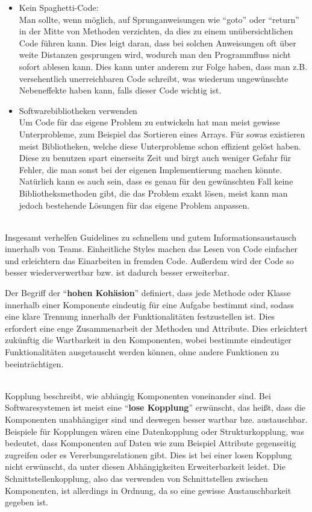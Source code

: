 \begin{itemize}
\item Kein Spaghetti-Code:\\
	Man sollte, wenn möglich, auf Sprunganweisungen wie ``goto'' oder ``return'' in der Mitte von Methoden verzichten, da dies zu einem unübersichtlichen Code führen kann.
    Dies leigt daran, dass bei solchen Anweisungen oft über weite Distanzen gesprungen wird, wodurch man den Programmfluss nicht sofort ablesen kann. Dies kann unter anderem
    zur Folge haben, dass man z.B. versehentlich unerreichbaren Code schreibt, was wiederum ungewünschte Nebeneffekte haben kann, falls dieser Code wichtig ist.
\item Softwarebibliotheken verwenden\\
    Um Code für das eigene Problem zu entwickeln hat man meist gewisse Unterprobleme, zum Beispiel das Sortieren eines Arrays. Für sowas existieren meist Bibliotheken, welche
    diese Unterprobleme schon effizient gelöst haben. Diese zu benutzen spart einerseits Zeit und birgt auch weniger Gefahr für Fehler, die man sonst bei der eigenen Implementierung
    machen könnte. Natürlich kann es auch sein, dass es genau für den gewünschten Fall keine Bibliotheksmethoden gibt, die das Problem exakt lösen, meist kann man jedoch bestehende
    Lösungen für das eigene Problem anpassen.
\end{itemize}\ \\
Insgesamt verhelfen Guidelines zu schnellem und gutem Informationsaustausch innerhalb von Teams. Einheitliche Styles machen das Lesen von Code einfacher und erleichtern das Einarbeiten
in fremden Code. Außerdem wird der Code so besser wiederverwertbar bzw. ist dadurch besser erweiterbar.

Der Begriff der ``\textbf{hohen Kohäsion}'' definiert, dass jede Methode oder Klasse innerhalb einer Komponente eindeutig für eine Aufgabe bestimmt sind, sodass eine klare Trennung
innerhalb der Funktionalitäten festzustellen ist. Dies erfordert eine enge Zusammenarbeit der Methoden und Attribute. Dies erleichtert zukünftig die Wartbarkeit in den Komponenten, wobei
bestimmte eindeutiger Funktionalitäten ausgetauscht werden können, ohne andere Funktionen zu beeinträchtigen.\\ \ \par
Kopplung beschreibt, wie abhängig Komponenten voneinander sind. Bei Softwaresystemen ist meist eine ``\textbf{lose Kopplung}'' erwünscht, das heißt, dass die Komponenten unabhängiger sind
und deswegen besser wartbar bze. austauschbar. Beispiele für Kopplungen wären eine Datenkopplung oder Strukturkopplung, was bedeutet, dass Komponenten auf Daten wie zum Beispiel
Attribute gegenseitig zugreifen oder es Vererbungsrelationen gibt. Dies ist bei einer losen Kopplung nicht erwünscht, da unter diesen Abhängigkeiten Erweiterbarkeit leidet. Die
Schnittstellenkopplung, also das verwenden von Schnittstellen zwischen Komponenten, ist allerdings in Ordnung, da so eine gewisse Austauschbarkeit gegeben ist.
